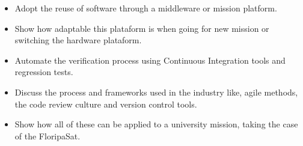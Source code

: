 \begin{itemize}
	\item Adopt the reuse of software through a middleware or mission platform.
	\item Show how adaptable this plataform is when going for new mission or
    switching the hardware plataform.
	\item Automate the verification process using Continuous Integration tools and
    regression tests.
  \item Discuss the process and frameworks used in the industry like, agile
    methods, the code review culture and version control tools.
  \item Show how all of these can be applied to a university mission, taking the
    case of the FloripaSat.
\end{itemize}
